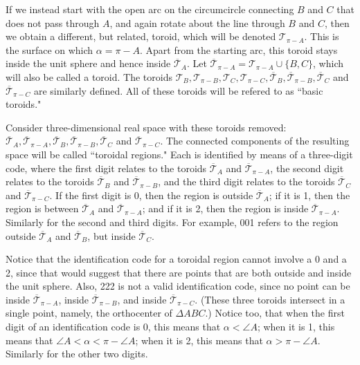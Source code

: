 \documentclass[a4paper, twoside]{article}
\begin{document}
If we instead start with the open arc on the circumcircle connecting $B$ and $C$ that does not pass through $A$, and again rotate about the line through $B$ and $C$, then we obtain a different, but related, toroid, which will be denoted $\mathcal{T}_{\pi-A}$. This is the surface on which $\alpha = \pi - A$. Apart from the starting arc, this toroid stays inside the unit sphere and hence inside $\overline{\mathcal{T}}_A$. Let $\overline{\mathcal{T}}_{\pi-A} = \mathcal{T}_{\pi-A} \cup \{B,C\}$, which will also be called a toroid. The toroids $\mathcal{T}_B, \mathcal{T}_{\pi-B}, \mathcal{T}_C, \mathcal{T}_{\pi-C}, \overline{\mathcal{T}}_B, \overline{\mathcal{T}}_{\pi-B},\overline{\mathcal{T}}_C$ and $\overline{\mathcal{T}}_{\pi-C}$ are similarly defined. All of these toroids will be refered to as ``basic toroids."

Consider three-dimensional real space with these toroids removed: $\overline{\mathcal{T}}_A, \overline{\mathcal{T}}_{\pi-A}, \overline{\mathcal{T}}_B, \overline{\mathcal{T}}_{\pi-B}, \overline{\mathcal{T}}_C$ and $\overline{\mathcal{T}}_{\pi-C}$. The connected components of the resulting space will be called ``toroidal regions." Each is identified by means of a three-digit code, where the first digit relates to the toroids $\overline{\mathcal{T}}_A$ and $\overline{\mathcal{T}}_{\pi-A}$, the second digit relates to the toroids $\overline{\mathcal{T}}_B$ and $\overline{\mathcal{T}}_{\pi-B}$, and the third digit relates to the toroids $\overline{\mathcal{T}}_C$ and $\overline{\mathcal{T}}_{\pi-C}$. If the first digit is 0, then the region is outside $\overline{\mathcal{T}}_A$; if it is 1, then the region is between $\overline{\mathcal{T}}_A$ and $\overline{\mathcal{T}}_{\pi-A}$; and if it is 2, then the region is inside $\overline{\mathcal{T}}_{\pi-A}$. Similarly for the second and third digits. For example, 001 refers to the region outside $\overline{\mathcal{T}}_A$ and $\overline{\mathcal{T}}_B$, but inside $\overline{\mathcal{T}}_C$.

Notice that the identification code for a toroidal region cannot involve a 0 and a 2, since that would suggest that there are points that are both outside and inside the unit sphere. Also, 222 is not a valid identification code, since no point can be inside $\overline{\mathcal{T}}_{\pi-A}$, inside $\overline{\mathcal{T}}_{\pi-B}$, and inside $\overline{\mathcal{T}}_{\pi-C}$. (These three toroids intersect in a single point, namely, the orthocenter of $\Delta ABC$.) Notice too, that when the first digit of an identification code is 0, this means that $\alpha < \angle A$; when it is 1, this means that $\angle A < \alpha < \pi-\angle A$; when it is 2, this means that $\alpha > \pi - \angle A$. Similarly for the other two digits.  
\end{document}
